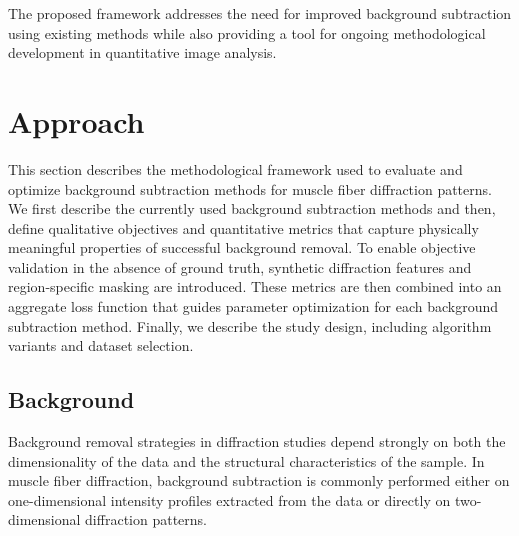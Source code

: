 \documentclass[iucr]{iucrjournals}
\begin{document}
The proposed framework addresses the need for improved background subtraction using existing methods while also providing a tool for ongoing methodological development in quantitative image analysis.



\section{Approach}
\label{sec:approach}

This section describes the methodological framework used to evaluate and optimize background subtraction methods for muscle fiber diffraction patterns. We first describe the currently used background subtraction methods and then, define qualitative objectives and quantitative metrics that capture physically meaningful properties of successful background removal. To enable objective validation in the absence of ground truth, synthetic diffraction features and region-specific masking are introduced. These metrics are then combined into an aggregate loss function that guides parameter optimization for each background subtraction method. Finally, we describe the study design, including algorithm variants and dataset selection.

\subsection{Background}
\label{sec:background}

Background removal strategies in diffraction studies depend strongly on both the dimensionality of the data and the structural characteristics of the sample. In muscle fiber diffraction, background subtraction is commonly performed either on one-dimensional intensity profiles extracted from the data or directly on two-dimensional diffraction patterns.
\end{document}
